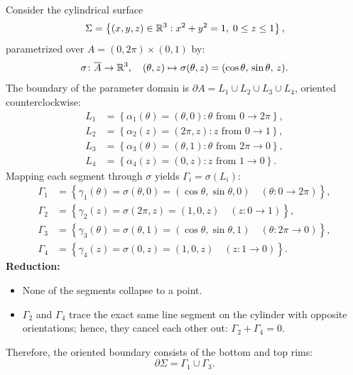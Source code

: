 \begin{exemple}[Cylinder]
Consider the cylindrical surface
\begin{equation*}
    \Sigma = \left\{ (x,y,z) \in \mathbb{R}^3 : x^2 + y^2 = 1, \; 0 \le z \le 1 \right\},
\end{equation*}
parametrized over $A = (0, 2\pi) \times (0, 1)$ by:
\begin{equation*}
    \sigma \colon \overline{A} \to \mathbb{R}^3, \quad (\theta, z) \mapsto \sigma(\theta, z) = (\cos\theta, \, \sin\theta, \, z).
\end{equation*}
The boundary of the parameter domain is $\partial A = L_1 \cup L_2 \cup L_3 \cup L_4$, oriented counterclockwise:
\begin{align*}
    L_1 &= \left\{ \alpha_1(\theta) = (\theta, 0) : \theta \text{ from } 0 \to 2\pi \right\}, \\
    L_2 &= \left\{ \alpha_2(z) = (2\pi, z) : z \text{ from } 0 \to 1 \right\}, \\
    L_3 &= \left\{ \alpha_3(\theta) = (\theta, 1) : \theta \text{ from } 2\pi \to 0 \right\}, \\
    L_4 &= \left\{ \alpha_4(z) = (0, z) : z \text{ from } 1 \to 0 \right\}.
\end{align*}
Mapping each segment through $\sigma$ yields $\Gamma_i = \sigma(L_i)$:
\begin{align*}
    \Gamma_1 &= \left\{ \gamma_1(\theta) = \sigma(\theta, 0) = (\cos\theta, \sin\theta, 0) \quad (\theta \colon 0 \to 2\pi) \right\}, \\
    \Gamma_2 &= \left\{ \gamma_2(z) = \sigma(2\pi, z) = (1, 0, z) \quad (z \colon 0 \to 1) \right\}, \\
    \Gamma_3 &= \left\{ \gamma_3(\theta) = \sigma(\theta, 1) = (\cos\theta, \sin\theta, 1) \quad (\theta \colon 2\pi \to 0) \right\}, \\
    \Gamma_4 &= \left\{ \gamma_4(z) = \sigma(0, z) = (1, 0, z) \quad (z \colon 1 \to 0) \right\}.
\end{align*}
\textbf{Reduction:}
\begin{itemize}
    \item None of the segments collapse to a point.
    \item $\Gamma_2$ and $\Gamma_4$ trace the exact same line segment on the cylinder with opposite orientations; hence, they cancel each other out: $\Gamma_2 + \Gamma_4 = 0$.
\end{itemize}
Therefore, the oriented boundary consists of the bottom and top rims:
\begin{equation*}
    \partial \Sigma = \Gamma_1 \cup \Gamma_3.
\end{equation*}
\end{exemple}


